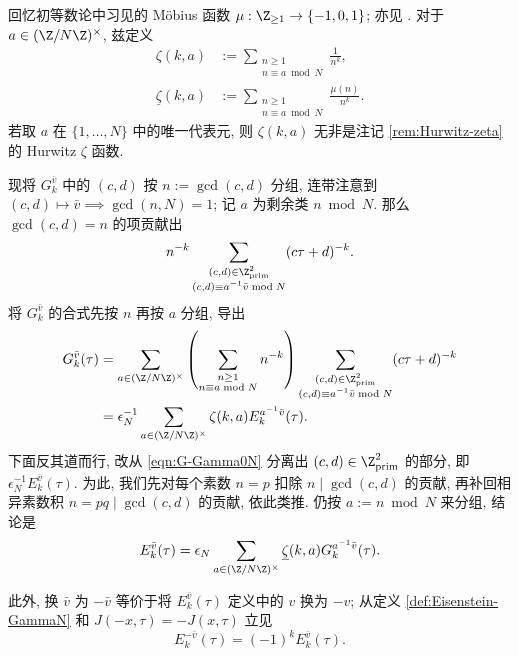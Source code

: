 回忆初等数论中习见的 Möbius 函数 $\mu: \Z_{\geq 1} \to \{-1,0,1\}$; 亦见 \cite[\S 5.4]{Li1}. 对于 $a \in (\Z/N\Z)^\times$, 兹定义
\begin{equation}\label{eqn:aux-zeta}\begin{aligned}
	\zeta(k,a) & := \sum_{\substack{n \geq 1 \\ n \equiv a \bmod N}} \frac{1}{n^k}, \\
	\underline{\zeta}(k,a) & := \sum_{\substack{n \geq 1 \\ n \equiv a \bmod N}} \frac{\mu(n)}{n^k}.
\end{aligned}\end{equation}
若取 $a$ 在 $\{1, \ldots, N \}$ 中的唯一代表元, 则 $\zeta(k,a)$ 无非是注记 \ref{rem:Hurwitz-zeta} 的 Hurwitz $\zeta$ 函数.

现将 $G^{\bar{v}}_k$ 中的 $(c,d)$ 按 $n := \gcd(c,d)$ 分组, 连带注意到 $(c,d) \mapsto \bar{v} \implies \gcd(n,N)=1$; 记 $a$ 为剩余类 $n \bmod N$. 那么 $\gcd(c,d) = n$ 的项贡献出
\[ n^{-k} \sum_{\substack{(c,d) \in \Z^2_\text{prim} \\ (c,d) \equiv a^{-1}\bar{v} \bmod N }} (c\tau+d)^{-k}. \]
将 $G^{\bar{v}}_k$ 的合式先按 $n$ 再按 $a$ 分组, 导出
\begin{align*}
	G^{\bar{v}}_k(\tau) & = \sum_{a \in (\Z/N\Z)^\times} \left(\sum_{\substack{n \geq 1 \\ n \equiv a \bmod N }} n^{-k} \right) \sum_{\substack{(c,d) \in \Z^2_\text{prim} \\ (c,d) \equiv a^{-1}\bar{v} \bmod N }} (c\tau+d)^{-k} \\
	& = \epsilon_N^{-1} \sum_{a \in (\Z/N\Z)^\times} \zeta(k,a) E^{a^{-1}\bar{v}}_k(\tau).
\end{align*}
下面反其道而行, 改从 \eqref{eqn:G-Gamma0N} 分离出 $(c,d) \in \Z^2_{\text{prim}}$ 的部分, 即 $\epsilon_N^{-1} E^{\bar{v}}_k(\tau)$. 为此, 我们先对每个素数 $n=p$ 扣除 $n \mid \gcd(c,d)$ 的贡献, 再补回相异素数积 $n=pq \mid \gcd(c,d)$ 的贡献, 依此类推. 仍按 $a := n \bmod N$ 来分组, 结论是
\[ E^{\bar{v}}_k(\tau) = \epsilon_N \sum_{a \in (\Z/N\Z)^\times} \underline{\zeta}(k,a) G^{a^{-1}\bar{v}}_k(\tau). \]

此外, 换 $\bar{v}$ 为 $-\bar{v}$ 等价于将 $E^{\bar{v}}_k(\tau)$ 定义中的 $v$ 换为 $-v$; 从定义 \ref{def:Eisenstein-GammaN} 和 $J(-x, \tau) = -J(x, \tau)$ 立见
\begin{equation}\label{eqn:Eisenstein-Gamma-flip}
	E^{-\bar{v}}_k(\tau) = (-1)^k E^{\bar{v}}_k(\tau).
\end{equation}

